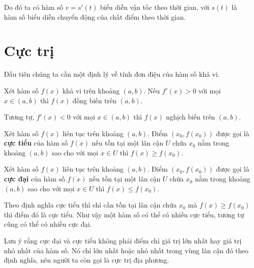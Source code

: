 Do đó ta có hàm số $v = s'(t)$ biểu diễn vận tốc theo thời gian, 
với $s(t)$ là hàm số biểu diễn chuyển động của chất điểm theo thời gian.

\section{Cực trị}

Đầu tiên chúng ta cần một định lý về tính đơn điệu của hàm số
khả vi.

\begin{theorem}
    Xét hàm số $f(x)$ khả vi trên khoảng $(a, b)$. Nếu $f'(x) > 0$ 
    với mọi $x \in (a, b)$ thì $f(x)$ đồng biến trên $(a, b)$.
\end{theorem}

Tương tự, $f'(x) < 0$ với mọi $x \in (a, b)$ thì $f(x)$ nghịch biến trên
$(a, b)$.

\begin{definition}
    Xét hàm số $f(x)$ liên tục trên khoảng $(a, b)$. Điểm $(x_0, f(x_0))$ được
    gọi là \textbf{cực tiểu} của hàm số $f(x)$ nếu tồn tại một lân cận $U$
    chứa $x_0$ nằm trong khoảng $(a, b)$ sao cho với mọi $x \in U$ thì $f(x) \geq f(x_0)$.
\end{definition}

\begin{definition}
    Xét hàm số $f(x)$ liên tục trên khoảng $(a, b)$. Điểm $(x_0, f(x_0))$ được
    gọi là \textbf{cực đại} của hàm số $f(x)$ nếu tồn tại một lân cận $U$
    chứa $x_0$ nằm trong khoảng $(a, b)$ sao cho với mọi $x \in U$ thì $f(x) \leq f(x_0)$.
\end{definition}

Theo định nghĩa cực tiểu thì chỉ cần tồn tại lân cận chứa $x_0$
mà $f(x) \geq f(x_0)$ thì điểm đó là cực tiểu. Như vậy một hàm số có 
thể có nhiều cực tiểu, tương tự cũng có thể có nhiều cực đại.

Lưu ý rằng cực đại và cực tiểu không phải điểm chỉ giá trị lớn nhất
hay giá trị nhỏ nhất của hàm số. Nó chỉ lớn nhất hoặc nhỏ nhất trong
vùng lân cận đó theo định nghĩa, nên người ta còn gọi là cực trị địa phương.


